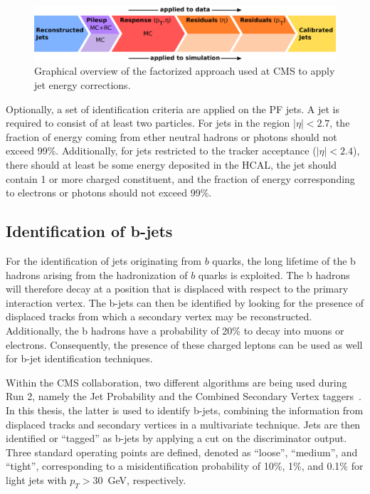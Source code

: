 \begin{figure}[ht]
  \centering
 \includegraphics[width=.85\textwidth]{JEC.pdf} 
 \caption{Graphical overview of the factorized approach used at \ac{CMS} to apply jet energy corrections.}
 \label{fig:JEC}
\end{figure}

Optionally, a set of identification criteria are applied on the \ac{PF} jets. A jet is required to consist of at least two particles. For jets in the region $|\eta| < 2.7$, the fraction of energy coming from ether neutral hadrons or photons should not exceed 99\%. Additionally, for jets restricted to the tracker acceptance ($|\eta| < 2.4$), there should at least be some energy deposited in the \ac{HCAL}, the jet should contain 1 or more charged constituent, and the fraction of energy corresponding to electrons or photons should not exceed 99\%.

\subsection{Identification of b-jets}
\label{sec:btagging}

For the identification of jets originating from $b$ quarks, the long lifetime of the b hadrons arising from the hadronization of $b$ quarks is exploited. The b hadrons will therefore decay at a position that is displaced with respect to the primary interaction vertex. The b-jets can then be identified by looking for the presence of displaced tracks from which a secondary vertex may be reconstructed. Additionally, the b hadrons have a probability of 20\% to decay into muons or electrons. Consequently, the presence of these charged leptons can be used as well for b-jet identification techniques.

Within the \ac{CMS} collaboration, two different algorithms are being used during Run 2, namely the Jet Probability and the Combined Secondary Vertex taggers~\cite{Chatrchyan:2012jua}. In this thesis, the latter is used to identify b-jets, combining the information from displaced tracks and secondary vertices in a multivariate technique. Jets are then identified or ``tagged'' as b-jets by applying a cut on the discriminator output. Three standard operating points are defined, denoted as ``loose'', ``medium'', and ``tight'', corresponding to a misidentification probability of 10\%, 1\%, and 0.1\% for light jets with $p_T > 30$~GeV, respectively.
